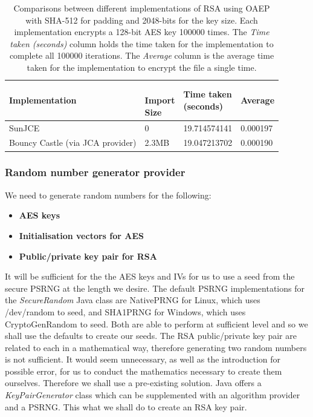 \documentclass[12pt, titlepage]{article}
\begin{document}
\begin{center}
\begin{table}[H]
    \begin{tabular}{ | l | l | l | l |}
    \hline
    \textbf{Implementation} & \shortstack{ \\ \textbf{Import} \\ \textbf{Size}} & \shortstack{\textbf{Time taken} \\ \textbf{(seconds)}} & \textbf{Average} \\ \hline
    
    SunJCE & 0 & 19.714574141  & 0.000197 \\ \hline
    
     Bouncy Castle (via JCA provider) & 2.3MB & 19.047213702 & 0.000190 \\ \hline
    
    \end{tabular}
    \caption{Comparisons between different implementations of RSA using OAEP with SHA-512 for padding and 2048-bits for the key size. Each implementation encrypts a 128-bit AES key 100000 times. The \textit{Time taken (seconds)} column holds the time taken for the implementation to complete all 100000 iterations. The \textit{Average} column is the average time taken for the implementation to encrypt the file a single time.} \label{tab:rsaComparison}
    \end{table}
\end{center}

\subsubsection{Random number generator provider}
We need to generate random numbers for the following:
\begin{itemize}
	\item \textbf{AES keys}
	\item \textbf{Initialisation vectors for AES}
	\item \textbf{Public/private key pair for RSA}
\end{itemize}
It will be sufficient for the the AES keys and IVs for us to use a seed from the secure PSRNG at the length we desire. The default PSRNG implementations for the \textit{SecureRandom} Java class are NativePRNG for Linux, which uses /dev/random to seed, and SHA1PRNG for Windows, which uses CryptoGenRandom to seed. Both are able to perform at sufficient level and so we shall use the defaults to create our seeds.
\newline \indent The RSA public/private key pair are related to each in a mathematical way, therefore generating two random numbers is not sufficient. It would seem unnecessary, as well as the introduction for possible error, for us to conduct the mathematics necessary to create them ourselves. Therefore we shall use a pre-existing solution. Java offers a \textit{KeyPairGenerator} class which can be supplemented with an algorithm provider and a PSRNG. This what we shall do to create an RSA key pair.
\end{document}
